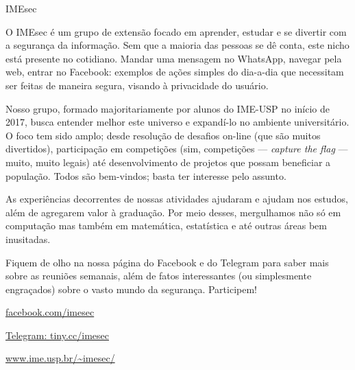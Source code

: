\begin{subsecao}{IMEsec}


O IMEsec é um grupo de extensão focado em aprender, estudar e se divertir com a
segurança da informação. Sem que a maioria das pessoas se dê conta, este nicho
está presente no cotidiano. Mandar uma mensagem no WhatsApp, navegar pela web,
entrar no Facebook: exemplos de ações simples do dia-a-dia que necessitam ser
feitas de maneira segura, visando à privacidade do usuário.

Nosso grupo, formado majoritariamente por alunos do IME-USP no início de 2017,
busca entender melhor este universo e expandí-lo no ambiente universitário. O
foco tem sido amplo; desde resolução de desafios on-line (que são muitos
divertidos), participação em competições (sim, competições — \textit{capture the
flag} — muito, muito legais) até desenvolvimento de projetos que possam
beneficiar a população. Todos são bem-vindos; basta ter interesse pelo assunto.

As experiências decorrentes de nossas atividades ajudaram e ajudam nos estudos,
além de agregarem valor à graduação. Por meio desses, mergulhamos não só em
computação mas também em matemática, estatística e até outras áreas bem
inusitadas.

Fiquem de olho na nossa página do Facebook e do Telegram para saber mais sobre
as reuniões semanais, além de fatos interessantes (ou simplesmente engraçados)
sobre o vasto mundo da segurança. Participem!

\begin{center}
  \Large
  \url{facebook.com/imesec}

  \url{Telegram: tiny.cc/imesec}

  \url{www.ime.usp.br/~imesec/}
\end{center}

\end{subsecao}
